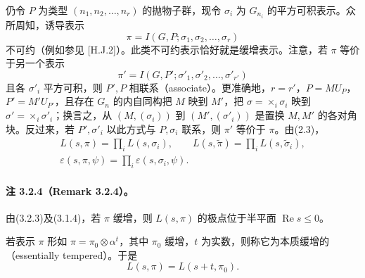 仍令 $P$ 为类型 $(n_1,n_2,\ldots,n_r)$ 的抛物子群，现令 $\sigma_i$ 为 $G_{n_i}$ 的平方可积表示。众所周知，诱导表示
\begin{equation}
 \pi=I(G,P;\sigma_1,\sigma_2,\ldots,\sigma_r)\tag{3.2.1}
\end{equation}
不可约（例如参见 [H.J.2]）。此类不可约表示恰好就是缓增表示。注意，若 $\pi$ 等价于另一个表示
\begin{equation}
 \pi'=I(G,P';\sigma'_1,\sigma'_2,\ldots,\sigma'_{r'})\tag{3.2.2}
\end{equation}
且各 $\sigma'_i$ 平方可积，则 $P',P$ 相联系（associate）。更准确地，$r=r'$，$P=MU_P$，$P'=M'U_{P'}$，且存在 $G_n$ 的内自同构把 $M$ 映到 $M'$，把 $\sigma=\mathop{\times}_i\sigma_i$ 映到 $\sigma'=\mathop{\times}_i\sigma'_i$；换言之，从 $(M,(\sigma_i))$ 到 $(M',(\sigma'_i))$ 是置换 $M,M'$ 的各对角块。反过来，若 $P',\sigma'_i$ 以此方式与 $P,\sigma_i$ 联系，则 $\pi'$ 等价于 $\pi$。由(2.3)，
\begin{equation}
\begin{gathered}
 L(s,\pi)=\prod_iL(s,\sigma_i),\qquad L(s,\widetilde\pi)=\prod_iL(s,\widetilde\sigma_i),\\
 \varepsilon(s,\pi,\psi)=\prod_i\varepsilon(s,\sigma_i,\psi).
\end{gathered}\tag{3.2.3}
\end{equation}

\paragraph*{注 3.2.4（Remark 3.2.4）。}
由(3.2.3)及(3.1.4)，若 $\pi$ 缓增，则 $L(s,\pi)$ 的极点位于半平面 $\operatorname{Re}s\leq0$。

若表示 $\pi$ 形如 $\pi=\pi_0\otimes\alpha^t$，其中 $\pi_0$ 缓增，$t$ 为实数，则称它为本质缓增的（essentially tempered）。于是
\begin{equation}
 L(s,\pi)=L(s+t,\pi_0).\tag{3.2.5}
\end{equation}


